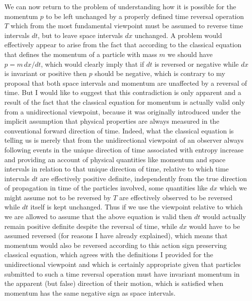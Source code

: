\documentclass[notitlepage,12pt]{report}
\begin{document}
We can now return to the problem of understanding how it is possible for the momentum $p$ to be left unchanged by a properly defined time reversal operation $T$ which from the most fundamental viewpoint must be assumed to reverse time intervals $dt$, but to leave space intervals $dx$ unchanged. A problem would effectively appear to arise from the fact that according to the classical equation that defines the momentum of a particle with mass $m$ we should have $p=m\,dx/dt$, which would clearly imply that if $dt$ is reversed or negative while $dx$ is invariant or positive then $p$ should be negative, which is contrary to my proposal that both space intervals and momentum are unaffected by a reversal of time. But I would like to suggest that this contradiction is only apparent and a result of the fact that the classical equation for momentum is actually valid only from a unidirectional viewpoint, because it was originally introduced under the implicit assumption that physical properties are always measured in the conventional forward direction of time. Indeed, what the classical equation is telling us is merely that from the unidirectional viewpoint of an observer always following events in the unique direction of time associated with entropy increase and providing an account of physical quantities like momentum and space intervals in relation to that unique direction of time, relative to which time intervals $dt$ are effectively positive definite, independently from the true direction of propagation in time of the particles involved, some quantities like $dx$ which we might assume not to be reversed by $T$ are effectively observed to be reversed while $dt$ itself is kept unchanged. Thus if we use the viewpoint relative to which we are allowed to assume that the above equation is valid then $dt$ would actually remain positive definite despite the reversal of time, while $dx$ would have to be assumed reversed (for reasons I have already explained), which means that momentum would also be reversed according to this action sign preserving classical equation, which agrees with the definitions I provided for the unidirectional viewpoint and which is certainly appropriate given that particles submitted to such a time reversal operation must have invariant momentum in the apparent (but false) direction of their motion, which is satisfied when momentum has the same negative sign as space intervals.
\end{document}
